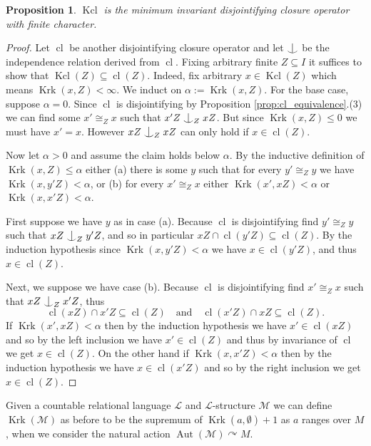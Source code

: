 \documentclass[12pt]{amsart}
\theoremstyle{plain}
\newtheorem{proposition}[theorem]{Proposition}
\theoremstyle{definition}
\newcommand{\isom}{\cong}
\newcommand{\mcL}{\mathcal{L}}
\newcommand{\mcM}{\mathcal{M}}
\DeclareMathOperator{\Aut}{Aut}
\DeclareMathOperator{\cl}{cl}
\DeclareMathOperator{\clmin}{Kcl}
\DeclareMathOperator{\Krk}{Krk}
\newcommand{\forkindep}[1][]{%
  \mathrel{
    \mathop{
      \vcenter{
        \hbox{\oalign{\noalign{\kern-.3ex}\hfil$\vert$\hfil\cr
              \noalign{\kern-.7ex}
              $\smile$\cr\noalign{\kern-.3ex}}}
      }
    }\displaylimits_{#1}
  }
}
\begin{document}
\begin{proposition}
$\clmin$ is the minimum invariant disjointifying closure operator with finite character.
\end{proposition}

\begin{proof}
Let $\cl$ be another disjointifying closure operator and let $\forkindep$ be the independence relation derived from $\cl$.
Fixing arbitrary finite $Z \subseteq I$ it suffices to show that $\clmin(Z) \subseteq \cl(Z)$.
Indeed, fix arbitrary $x \in \clmin(Z)$ which means $\Krk(x, Z) < \infty$.
We induct on $\alpha := \Krk(x, Z)$.
For the base case, suppose $\alpha = 0$.
Since $\cl$ is disjointifying by Proposition \ref{prop:cl_equivalence}.(3) we can find some $x' \isom_Z x$ such that $x'Z \forkindep[Z] xZ$.
But since $\Krk(x, Z) \le 0$ we must have $x' = x$.
However $xZ \forkindep[Z] xZ$ can only hold if $x \in \cl(Z)$.

Now let $\alpha > 0$ and assume the claim holds below $\alpha$.
By the inductive definition of $\Krk(x, Z) \le \alpha$ either (a) there is some $y$ such that for every $y' \isom_Z y$ we have $\Krk(x, y'Z) < \alpha$, or (b) for every $x' \isom_Z x$ either $\Krk(x', xZ) < \alpha$ or $\Krk(x, x'Z) < \alpha$.

First suppose we have $y$ as in case (a).
Because $\cl$ is disjointifying find $y' \isom_Z y$ such that $xZ \forkindep[Z] y'Z$, and so in particular $xZ \cap \cl(y'Z) \subseteq \cl(Z)$.
By the induction hypothesis since $\Krk(x, y'Z) < \alpha$ we have $x \in \cl(y'Z)$, and thus $x \in \cl(Z)$.

Next, we suppose we have case (b).
Because $\cl$ is disjointifying find $x' \isom_Z x$ such that $xZ \forkindep[Z] x'Z$, thus \[\cl(xZ) \cap x'Z \subseteq \cl(Z) \quad \text{and} \quad \cl(x'Z) \cap xZ \subseteq \cl(Z).\]
If $\Krk(x', xZ) < \alpha$ then by the induction hypothesis we have $x' \in \cl(xZ)$ and so by the left inclusion we have $x' \in \cl(Z)$ and thus by invariance of $\cl$ we get $x \in \cl(Z)$.
On the other hand if $\Krk(x, x'Z) < \alpha$ then by the induction hypothesis we have $x \in \cl(x'Z)$ and so by the right inclusion we get $x \in \cl(Z)$.
\end{proof}

Given a countable relational language $\mcL$ and $\mcL$-structure $\mcM$ we can define $\Krk(\mcM)$ as before to be the supremum of $\Krk(a, \emptyset) + 1$ as $a$ ranges over $M$, when we consider the natural action $\Aut(\mcM) \curvearrowright M$.
\end{document}
